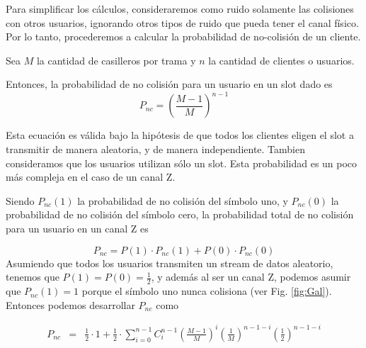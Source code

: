 Para simplificar los cálculos, consideraremos como ruido solamente las colisiones con otros usuarios, ignorando otros tipos de ruido que pueda tener el canal físico. Por lo tanto, procederemos a calcular la probabilidad de no-colisión de un cliente.

Sea $M$ la cantidad de casilleros por trama y $n$ la cantidad de clientes o usuarios.

Entonces, la probabilidad de no colisión para un usuario en un slot dado es
\begin{equation}
P_{nc}=\left(\frac{M-1}{M}\right)^{n-1}
\end{equation}

Esta ecuación es válida bajo la hipótesis de que todos los clientes eligen el slot a transmitir de manera aleatoria, y de manera independiente. Tambien consideramos que los usuarios utilizan sólo un slot.
\noindent Esta probabilidad es un poco más compleja en el caso de un canal Z. 

Siendo $P_{nc}(1)$ la probabilidad de no colisión del símbolo uno, y $P_{nc}(0)$ la probabilidad de no colisión del símbolo cero, la probabilidad total de no colisión para un usuario en un canal Z es

\begin{equation}
P_{nc}=P(1)\cdot P_{nc}(1) + P(0) \cdot P_{nc}(0) 
\end{equation}
Asumiendo que todos los usuarios transmiten un stream de datos aleatorio, tenemos que $P(1)=P(0)=\frac{1}{2}$, y además al ser un canal Z, podemos asumir que $P_{nc}(1)=1$ porque el símbolo uno nunca colisiona (ver Fig. \ref{fig:Gal}). Entonces podemos desarrollar $P_{nc}$ como

\begin{eqnarray}
P_{nc} & = & \frac{1}{2} \cdot 1 +  \frac{1}{2} \cdot \sum_{i=0}^{n-1} 
C^{n-1}_{i} \left(\frac{M-1}{M}\right)^i  \left(\frac{1}{M}\right)^{n-1-i}  \left(\frac{1}{2}\right)^{n-1-i} 
\end{eqnarray}

